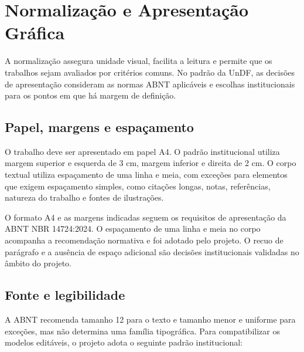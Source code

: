 \chapter{Normalização e Apresentação Gráfica}

A normalização assegura unidade visual, facilita a leitura e permite que os trabalhos sejam avaliados por critérios comuns. No padrão da UnDF, as decisões de apresentação consideram as normas ABNT aplicáveis e escolhas institucionais para os pontos em que há margem de definição.

\section{Papel, margens e espaçamento}

O trabalho deve ser apresentado em papel A4. O padrão institucional utiliza margem superior e esquerda de 3 cm, margem inferior e direita de 2 cm. O corpo textual utiliza espaçamento de uma linha e meia, com exceções para elementos que exigem espaçamento simples, como citações longas, notas, referências, natureza do trabalho e fontes de ilustrações.

\requisitonormativo

O formato A4 e as margens indicadas seguem os requisitos de apresentação da ABNT NBR 14724:2024. O espaçamento de uma linha e meia no corpo acompanha a recomendação normativa e foi adotado pelo projeto. O recuo de parágrafo e a ausência de espaço adicional são decisões institucionais validadas no âmbito do projeto.

\recomendacaonormativa

\decisaoinstitucional

\section{Fonte e legibilidade}

A ABNT recomenda tamanho 12 para o texto e tamanho menor e uniforme para exceções, mas não determina uma família tipográfica. Para compatibilizar os modelos editáveis, o projeto adota o seguinte padrão institucional:

\decisaoinstitucional

